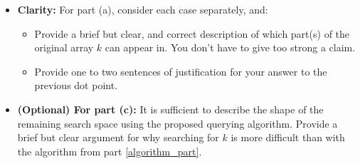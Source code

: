 \documentclass[12pt]{article}
\begin{document}
\newpage

\begin{rubric}

\begin{itemize}

 \item\textbf{Clarity:} For part (a), consider each case separately, and:
    \begin{itemize}
        \item Provide a brief but clear, and correct description of which part(s) of the original array $k$ can appear in. You don't have to give too strong a claim.
        \item Provide one to two sentences of justification for your answer to the previous dot point.
    \end{itemize}

    \item {\bfseries (Optional) For part (c):} It is sufficient to describe the shape of the remaining search space using the proposed querying algorithm. Provide a brief but clear argument for why searching for $k$ is more difficult than with the algorithm from part \ref{algorithm_part}.

\end{itemize}
\end{rubric}
\newpage
\begin{solution}
\end{solution}
\begin{attribution}
\end{attribution}
\end{document}
